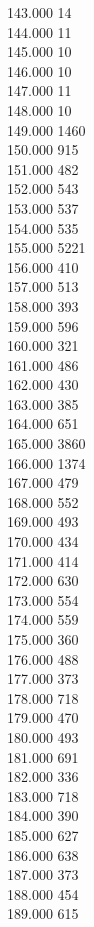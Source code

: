 { 143.000	14 \\
 144.000	11 \\
 145.000	10 \\
 146.000	10 \\
 147.000	11 \\
 148.000	10 \\
 149.000	1460 \\
 150.000	915 \\
 151.000	482 \\
 152.000	543 \\
 153.000	537 \\
 154.000	535 \\
 155.000	5221 \\
 156.000	410 \\
 157.000	513 \\
 158.000	393 \\
 159.000	596 \\
 160.000	321 \\
 161.000	486 \\
 162.000	430 \\
 163.000	385 \\
 164.000	651 \\
 165.000	3860 \\
 166.000	1374 \\
 167.000	479 \\
 168.000	552 \\
 169.000	493 \\
 170.000	434 \\
 171.000	414 \\
 172.000	630 \\
 173.000	554 \\
 174.000	559 \\
 175.000	360 \\
 176.000	488 \\
 177.000	373 \\
 178.000	718 \\
 179.000	470 \\
 180.000	493 \\
 181.000	691 \\
 182.000	336 \\
 183.000	718 \\
 184.000	390 \\
 185.000	627 \\
 186.000	638 \\
 187.000	373 \\
 188.000	454 \\
 189.000	615 \\
}
